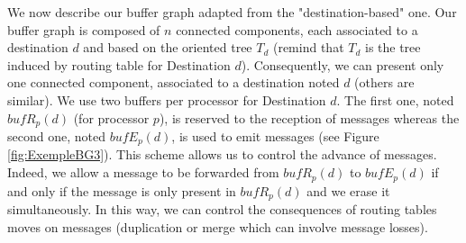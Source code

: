 \documentclass[11pt]{article}
\begin{document}
We now describe our buffer graph adapted from the "destination-based" one. Our buffer graph is composed of $n$ connected components, each associated to a destination $d$ and based on the oriented tree $T_{d}$ (remind that $T_{d}$ is the tree induced by routing table for Destination $d$). Consequently, we can present only one connected component, associated to a destination noted $d$ (others are similar). We use two buffers per processor for Destination $d$. The first one, noted $bufR_{p}(d)$ (for processor $p$), is reserved to the reception of messages whereas the second one, noted $bufE_{p}(d)$, is used to emit messages (see Figure \ref{fig:ExempleBG3}). This scheme allows us to control the advance of messages. Indeed, we allow a message to be forwarded from $bufR_{p}(d)$ to $bufE_{p}(d)$ if and only if the message is only present in $bufR_{p}(d)$ and we erase it simultaneously. In this way, we can control the consequences of routing tables moves on messages (duplication or merge which can involve message losses).
\end{document}
